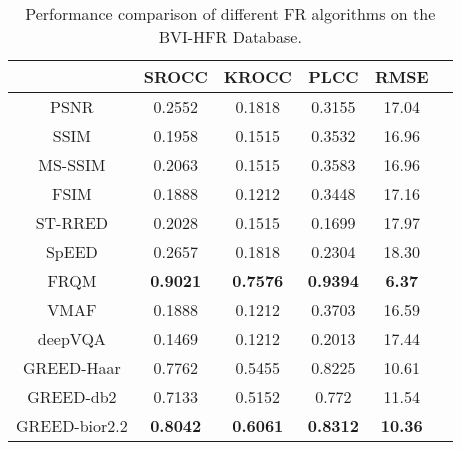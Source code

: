\documentclass[journal]{IEEEtran}
\begin{document}
\begin{table}[t]
\caption{Performance comparison of different FR algorithms on the BVI-HFR Database.}
\label{table:BVI_HFR}
    \centering
    \begin{tabular}{|c||c|c|c|c|c|}
        \hline
        ~ & SROCC  & KROCC  & PLCC  & RMSE  \\ \hline \hline
        PSNR & 0.2552 & 0.1818 & 0.3155 & 17.04 \\ 
        SSIM \cite{wang2004image} & 0.1958 & 0.1515 & 0.3532 & 16.96 \\ 
        MS-SSIM \cite{wang2003multiscale} & 0.2063 & 0.1515 & 0.3583 & 16.96 \\ 
        FSIM \cite{zhang2011fsim} & 0.1888 & 0.1212 & 0.3448 & 17.16 \\ 
        ST-RRED \cite{soundararajan2012video} & 0.2028 & 0.1515 & 0.1699 & 17.97 \\
        SpEED \cite{bampis2017speed} & 0.2657 & 0.1818 & 0.2304 & 18.30 \\ 
        FRQM \cite{zhang2017frame} & \textbf{0.9021} & \textbf{0.7576} & \textbf{0.9394} & \textbf{6.37} \\ 
        VMAF \cite{VMAF2016} & 0.1888 & 0.1212 & 0.3703 & 16.59 \\
        deepVQA \cite{kim2018deep} & 0.1469 & 0.1212 & 0.2013 & 17.44 \\ \hline
        GREED-Haar & 0.7762 & 0.5455 & 0.8225 & 10.61 \\
        GREED-db2 & 0.7133 & 0.5152 & 0.772 & 11.54 \\
        GREED-bior2.2 & \textbf{0.8042} & \textbf{0.6061} & \textbf{0.8312} & \textbf{10.36} \\
        \hline
    \end{tabular}
\end{table}
\end{document}
